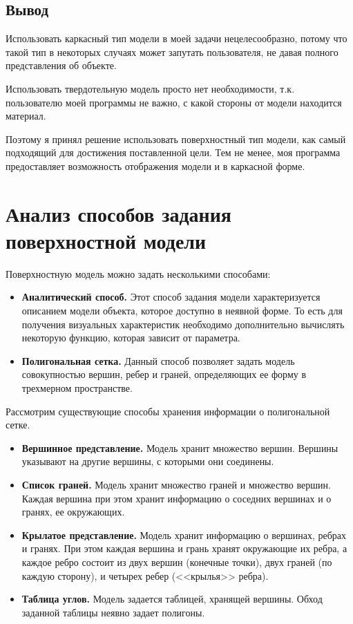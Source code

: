 \subsection*{Вывод}
Использовать каркасный тип модели в моей задачи нецелесообразно, потому что такой тип в некоторых случаях может запутать пользователя, не давая полного представления об объекте.

Использовать твердотельную модель просто нет необходимости, т.к. пользователю моей программы не важно, с какой стороны от модели находится материал.

Поэтому я принял решение использовать поверхностный тип модели, как самый подходящий для достижения поставленной цели. Тем не менее, моя программа предоставляет возможность отображения модели и в каркасной форме.


\section{Анализ способов задания поверхностной модели}

Поверхностную модель можно задать несколькими способами:
\begin{itemize}[label=---]
	\item \textbf{Аналитический способ.} Этот способ задания модели характеризуется описанием модели объекта, которое доступно в неявной форме. То есть для получения визуальных характеристик необходимо дополнительно вычислять некоторую функцию, которая зависит от параметра.
	\item \textbf{Полигональная сетка.} Данный способ позволяет задать модель совокупностью вершин, ребер и граней, определяющих ее форму в трехмерном пространстве.
\end{itemize}

Рассмотрим существующие способы хранения информации о полигональной сетке.

\begin{itemize}[label=---]
	\item \textbf{Вершинное представление.} Модель хранит множество вершин. Вершины указывают на другие вершины, с которыми они соединены.
	\item \textbf{Список граней.} Модель хранит множество граней и множество вершин. Каждая вершина при этом хранит информацию о соседних вершинах и о гранях, ее окружающих.
 	\item \textbf{Крылатое представление.} Модель хранит информацию о вершинах, ребрах и гранях. При этом каждая вершина и грань хранят окружающие их ребра, а каждое ребро состоит из двух вершин (конечные точки), двух граней (по каждую сторону), и четырех ребер (<<крылья>> ребра).
	\item \textbf{Таблица углов.} Модель задается таблицей, хранящей вершины. Обход заданной таблицы неявно задает полигоны.
\end{itemize}

